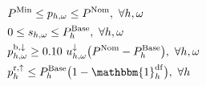 \documentclass[11pt,a4paper]{article}
\begin{document}
\begin{subequations}
\begin{align}
        \  & P^{\rm{Min}} \leq p_{h,\omega} \leq P^{\rm{Nom}}, \                                                                                                                                           \forall{h,\omega}                                                                             \label{power:11}                                                                                                                                                                                                                                         \\
        \  & 0 \leq s_{h,\omega} \leq P^{\rm{Base}}_{h}, \                                                                                                                                                   \forall{h,\omega}                                                                             \label{power:12}                                                                                                                                                                                                                                       \\
        \  & p^{\rm{b}, \downarrow}_{h,\omega} \geq 0.10 \  u^{\downarrow}_{h,\omega} \big(P^{\rm{Nom}} - P^{\rm{Base}}_{h}\big), \                                                                                  \forall{h,\omega}                                                                             \label{power:14}                                                                                                                                                                                                                               \\
        \  & p^{\rm{r}, \uparrow}_{h} \leq P^{\rm{Base}}_{h} \big(1 - \mathbbm{1}_{h}^{\rm{df}}\big), \                                                                                                                 \forall{h} \label{power:15}                                                                                                                                                                                                                                                                                                               \\

\end{align}
\end{subequations}
\end{document}
